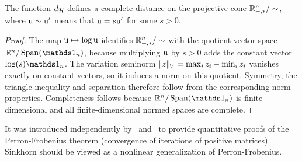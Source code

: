 \begin{prop}
	The function $d_{\mathcal{H}}$ defines a complete distance on the projective cone $\mathbb{R}_{+,*}^n/\sim$, where $\mathrm{u} \sim \mathrm{u}'$ means that $\mathrm{u}=s\mathrm{u}'$ for some $s>0$.
\end{prop}
\begin{proof}
	The map $\mathrm{u} \mapsto \log \mathrm{u}$ identifies $\mathbb{R}_{+,*}^n/\sim$ with the quotient vector space $\RR^n/\Span(\ones_n)$, because multiplying $\mathrm{u}$ by $s>0$ adds the constant vector $\log(s)\ones_n$. The variation seminorm $|\!| z |\!|_V=\max_i z_i-\min_i z_i$ vanishes exactly on constant vectors, so it induces a norm on this quotient. Symmetry, the triangle inequality and separation therefore follow from the corresponding norm properties. Completeness follows because $\RR^n/\Span(\ones_n)$ is finite-dimensional and all finite-dimensional normed spaces are complete.
\end{proof}
%
It was introduced independently by~\cite{birkhoff1957extensions} and~\cite{samelson1957perron} to provide quantitative proofs of the Perron-Frobenius theorem (convergence of iterations of positive matrices). Sinkhorn should be viewed as a nonlinear generalization of Perron-Frobenius.


